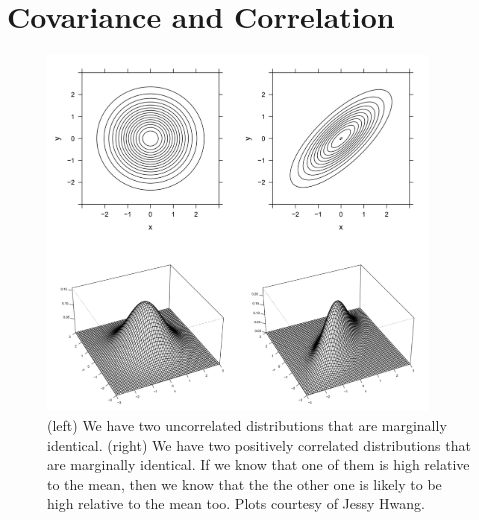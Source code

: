 \documentclass[11pt]{article}
\theoremstyle{definition}
\theoremstyle{remark}
\begin{document}
\section{Covariance and Correlation}
\begin{figure}[H]\centering
\includegraphics[width = 0.9\textwidth]{image/BVN.png}
\caption{(left) We have two uncorrelated distributions that are marginally identical. (right) We have two positively correlated distributions that are marginally identical. If we know that one of them is high relative to the mean, then we know that the the other one is likely to be high relative to the mean too. Plots courtesy of Jessy Hwang.}
\end{figure}
\end{document}
